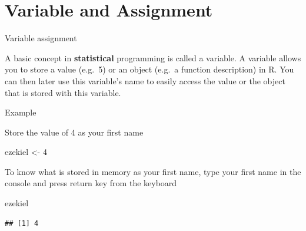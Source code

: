 \documentclass[
  ignorenonframetext,
]{beamer}
\newenvironment{Shaded}{\begin{snugshade}}{\end{snugshade}}
\newcommand{\DecValTok}[1]{\textcolor[rgb]{0.00,0.00,0.81}{#1}}
\newcommand{\NormalTok}[1]{#1}
\newcommand{\StringTok}[1]{\textcolor[rgb]{0.31,0.60,0.02}{#1}}
\begin{document}
\section{Variable and Assignment}
\begin{frame}[fragile]{Variable assignment}
\protect\hypertarget{variable-assignment}{}

A basic concept in \textbf{statistical} programming is called a
variable. A variable allows you to store a value (e.g.~5) or an object
(e.g.~a function description) in R. You can then later use this
variable's name to easily access the value or the object that is stored
with this variable.

\begin{block}{Example}

Store the value of 4 as your first name

\begin{Shaded}
\begin{Highlighting}[]
\NormalTok{ezekiel <-}\StringTok{ }\DecValTok{4}
\end{Highlighting}
\end{Shaded}

To know what is stored in memory as your first name, type your first
name in the console and press return key from the keyboard

\begin{Shaded}
\begin{Highlighting}[]
\NormalTok{ezekiel}
\end{Highlighting}
\end{Shaded}

\begin{verbatim}
## [1] 4
\end{verbatim}

\end{block}

\end{frame}
\end{document}
